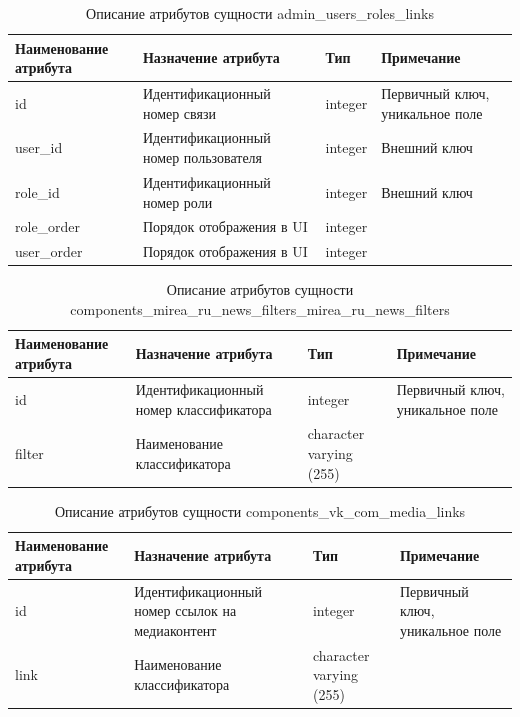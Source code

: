 \documentclass{mirea}
\begin{document}
	\begin{longtable}{ |p{}|p{}|p{}|p{}| } 
		\caption{Описание атрибутов сущности admin\_users\_roles\_links}
		\endfirsthead
		\endhead
		\hline
		Наименование атрибута & Назначение атрибута & Тип & Примечание \\ \hline
		
		id & Идентификацион\-ный номер связи & integer & Первичный ключ, уникальное поле \\ \hline
		
		user\_id & Идентификационный номер пользователя & integer & Внешний ключ \\ \hline
		
		role\_id & Идентификационный номер роли & integer & Внешний ключ \\ \hline
		
		role\_order & Порядок отображения в UI & integer & \\ \hline
		
		user\_order & Порядок отображения в UI & integer & \\ \hline
		
	\end{longtable}

	\begin{longtable}{ |p{}|p{}|p{}|p{}| } 
		\caption{Описание атрибутов сущности components\_mirea\_ru\_news\_filters\_mirea\_ru\_news\_filters}
		\endfirsthead
		\endhead
		\hline
		Наименование атрибута & Назначение атрибута & Тип & Примечание \\ \hline
		
		id & Идентификацион\-ный номер классификатора & integer & Первичный ключ, уникальное поле \\ \hline
		
		filter & Наименование классификатора & character varying (255) & \\ \hline
		
	\end{longtable}

	\begin{longtable}{ |p{}|p{}|p{}|p{}| } 
		\caption{Описание атрибутов сущности components\_vk\_com\_media\_links}
		\endfirsthead
		\endhead
		\hline
		Наименование атрибута & Назначение атрибута & Тип & Примечание \\ \hline
		
		id & Идентификацион\-ный номер ссылок на медиаконтент & integer & Первичный ключ, уникальное поле \\ \hline
		
		link & Наименование классификатора & character varying (255) & \\ \hline
		
	\end{longtable}
\end{document}
